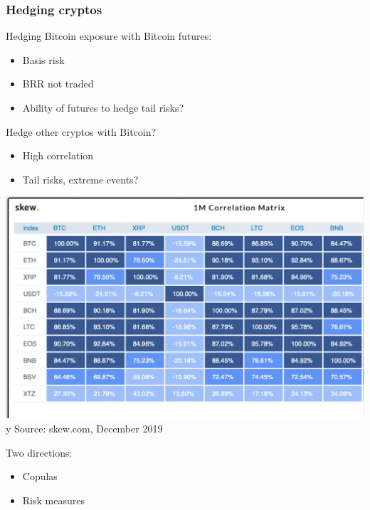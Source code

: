 \documentclass[10pt,mathserif,notes=show]{beamer}
\renewcommand{\(}{\begin{columns}}
\renewcommand{\)}{\end{columns}}
\newcommand{\<}[1]{\begin{column}{#1}}
\renewcommand{\>}{\end{column}}
\theoremstyle{definition}
\begin{document}
\begin{frame}
  \frametitle{Hedging cryptos}
  \begin{itemize}
  \item Hedging Bitcoin exposure with Bitcoin futures: 
    \begin{itemize}
    \item Basis risk
    \item BRR not traded
    \item Ability of futures to hedge tail risks?
    \end{itemize}
    \pause
    \begin{minipage}[t]{.525\linewidth}
    \item Hedge other cryptos with Bitcoin?
      \begin{itemize}
      \item High correlation
      \item Tail risks, extreme events?
      \end{itemize}
    \end{minipage}
    \begin{minipage}[t]{.45\linewidth}
      \begin{center}
        \includegraphics[scale=.125]{../_pics/SkewCorrelation.pdf}\\
        \hfill{\tin
          y Source: skew.com, December 2019}
      \end{center}
    \end{minipage}
    \vspace*{-4\baselineskip}
    \pause
    \item Two directions:
      \begin{itemize}
      \item Copulas
      \item Risk measures
      \end{itemize}
  \end{itemize}
\end{frame}
\end{document}

